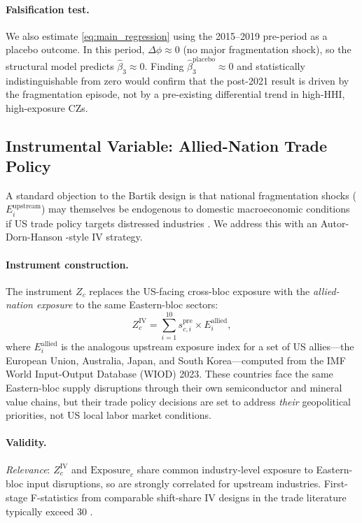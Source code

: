 \paragraph{Falsification test.}
We also estimate \eqref{eq:main_regression} using the 2015--2019 pre-period
as a placebo outcome. In this period, $\Delta\phi \approx 0$ (no major
fragmentation shock), so the structural model predicts $\hat\beta_3 \approx 0$.
Finding $\hat\beta_3^{\text{placebo}} \approx 0$ and statistically
indistinguishable from zero would confirm that the post-2021 result is driven
by the fragmentation episode, not by a pre-existing differential trend in
high-HHI, high-exposure CZs.

\subsection{Instrumental Variable: Allied-Nation Trade Policy}
\label{sec:iv}

A standard objection to the Bartik design is that national fragmentation
shocks ($E_i^{\text{upstream}}$) may themselves be endogenous to domestic
macroeconomic conditions if US trade policy targets distressed industries
\citep{handley2017}. We address this with an Autor-Dorn-Hanson
\citeyearpar{autor2013china}-style IV strategy.

\paragraph{Instrument construction.}
The instrument $Z_c$ replaces the US-facing cross-bloc exposure with the
\emph{allied-nation exposure} to the same Eastern-bloc sectors:
\begin{equation}
  Z_c^{\text{IV}} = \sum_{i=1}^{10} s_{c,i}^{\text{pre}} \times
  E_i^{\text{allied}},
  \label{eq:iv}
\end{equation}
where $E_i^{\text{allied}}$ is the analogous upstream exposure index
for a set of US allies---the European Union, Australia, Japan, and
South Korea---computed from the IMF World Input-Output Database (WIOD) 2023.
These countries face the same Eastern-bloc supply disruptions through their
own semiconductor and mineral value chains, but their trade policy decisions
are set to address \emph{their} geopolitical priorities, not US local labor
market conditions.

\paragraph{Validity.}
\emph{Relevance}: $Z_c^{\text{IV}}$ and $\text{Exposure}_c$ share common
industry-level exposure to Eastern-bloc input disruptions, so are strongly
correlated for upstream industries. First-stage F-statistics from comparable
shift-share IV designs in the trade literature typically exceed 30
\citep{autor2013china, acemoglu2016import}.

